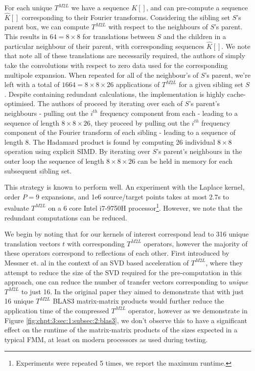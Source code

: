 For each unique $T^{M2L}$ we have a sequence $K[ ]$, and can pre-compute a sequence $\hat{K}[ ]$ corresponding to their Fourier transforms. Considering the sibling set $S$'s parent box, we can compute $T^{M2L}$ with respect to the neighbours of $S$'s parent. This results in $64 = 8 \times 8$ for translations between $S$ and the children in a particular neighbour of their parent, with corresponding sequences $\hat{K}[ ]$. We note that note all of these translations are necessarily required, the authors of \cite{malhotra2015pvfmm,wang2021exafmm} simply take the convolutions with respect to zero data used for the corresponding multipole expansion. When repeated for all of the neighbour's of $S$'s parent, we're left with a total of $1664 = 8 \times 8 \times 26$ applications of $T^{M2L}$ for a given sibling set $S$. Despite containing redundant calculations, the implementation is highly cache-optimised. The authors of \cite{malhotra2015pvfmm} proceed by iterating over each of $S$'s parent's neighbours - pulling out the $i^{th}$ frequency component from each - leading to a sequence of length $8 \times 8 \times 26$, they proceed by pulling out the $i^{th}$ frequency component of the Fourier transform of each sibling - leading to a sequence of length 8. The Hadamard product is found by computing 26 individual $8 \times 8$ operation using explicit SIMD. By iterating over $S$'s parent's neighbours in the outer loop the sequence of length $8 \times 8 \times 26$ can be held in memory for each subsequent sibling set.

This strategy is known to perform well. An experiment with the Laplace kernel, order $P=9$ expansions, and 1e6 source/target points takes at most 2.7s to evaluate $T^{M2L}$ on a 6 core Intel i7-9750H processor\footnote{Experiments were repeated 5 times, we report the maximum runtime.}. However, we note that the redundant computations can be reduced.

We begin by noting that for our kernels of interest correspond lead to 316 unique translation vectors $t$ with corresponding $T^{M2L}$ operators, however the majority of these operators correspond to reflections of each other. First introduced by Messner et. al \cite{messner2012optimized} in the context of an SVD based acceleration of $T^{M2L}$, where they attempt to reduce the size of the SVD required for the pre-computation in this approach, one can reduce the number of transfer vectors corresponding to \textit{unique} $T^{M2L}$ to just 16. In the original paper they aimed to demonstrate that with just 16 unique $T^{M2L}$ BLAS3 matrix-matrix products would further reduce the application time of the compressed $T^{M2L}$ operator, however as we demonstrate in Figure \ref{fig:chpt:3:sec:1:subsec:2:blas3}, we don't observe this to have a significant effect on the runtime of the matrix-matrix products of the sizes expected in a typical FMM, at least on modern processors as used during testing.

